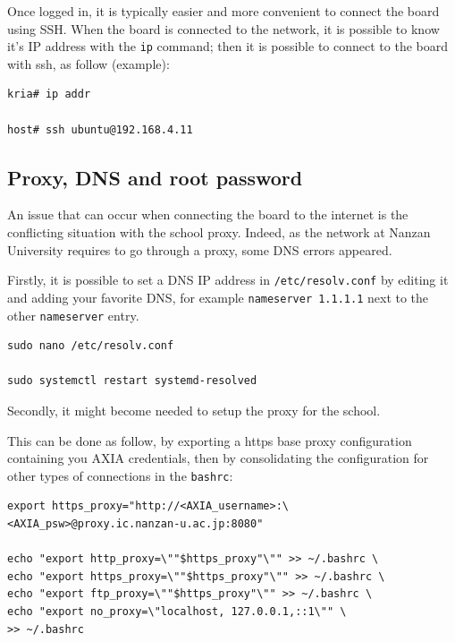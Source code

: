\documentclass[10pt]{article}
\begin{document}
Once logged in, it is typically easier and more convenient to connect the board
using SSH. When the board is connected to the network, it is possible to know
it's IP address with the \verb|ip| command; then it is possible to connect to
the board with ssh, as follow (example):
\begin{tcolorbox}
\begin{verbatim}
kria# ip addr

host# ssh ubuntu@192.168.4.11
\end{verbatim}
\end{tcolorbox}

\subsection{Proxy, DNS and root password}
An issue that can occur when connecting the board to the internet is the
conflicting situation with the school proxy. Indeed, as the network at Nanzan
University requires to go through a proxy, some DNS errors appeared.

Firstly, it is possible to set a DNS IP address in \verb|/etc/resolv.conf| by
editing it and adding your favorite DNS, for example \verb|nameserver 1.1.1.1|
next to the other \verb|nameserver| entry.
\begin{tcolorbox}
\begin{verbatim}
sudo nano /etc/resolv.conf

sudo systemctl restart systemd-resolved
\end{verbatim}
\end{tcolorbox}

Secondly, it might become needed to setup the proxy for the school.

This can be done as follow, by exporting a https base proxy configuration
containing you AXIA credentials, then by consolidating the configuration for
other types of connections in the \verb|bashrc|:
\begin{tcolorbox}
\begin{verbatim}
export https_proxy="http://<AXIA_username>:\
<AXIA_psw>@proxy.ic.nanzan-u.ac.jp:8080"

echo "export http_proxy=\""$https_proxy"\"" >> ~/.bashrc \
echo "export https_proxy=\""$https_proxy"\"" >> ~/.bashrc \
echo "export ftp_proxy=\""$https_proxy"\"" >> ~/.bashrc \
echo "export no_proxy=\"localhost, 127.0.0.1,::1\"" \
>> ~/.bashrc
\end{verbatim}
\end{tcolorbox}
\end{document}
